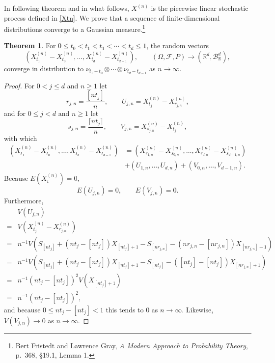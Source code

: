 \documentclass{article}
\theoremstyle{definition}
\newtheorem{theorem}{Theorem}
\theoremstyle{definition}
\begin{document}
In following theorem and in what follows, $X^{(n)}$ is the
piecewise linear stochastic process defined in \eqref{Xtn}. We prove that a sequence of finite-dimensional distributions
converge to a Gaussian measure.\footnote{Bert Fristedt and Lawrence Gray,
{\em A Modern Approach to Probability Theory}, 
p.~368, \S 19.1, Lemma 1.} 

\begin{theorem}
For $0 \leq t_0 < t_1 < t_1 < \cdots < t_d \leq 1$, the random vectors 
\[
(X^{(n)}_{t_1}-X^{(n)}_{t_0},\ldots,X^{(n)}_{t_d}-X^{(n)}_{t_{d-1}}),
\qquad (\Omega,\mathscr{F},P) \to
(\mathbb{R}^d,\mathscr{B}_{\mathbb{R}}^d),
\]
converge in distribution to $\nu_{t_1-t_0} \otimes \cdots \otimes \nu_{t_d-t_{d-1}}$ as $n \to \infty$. 
\label{jointtheorem}
\end{theorem}
\begin{proof}
For $0<j \leq d$ and $n \geq 1$ let
\[
r_{j,n} = \frac{[nt_j]}{n},\qquad U_{j,n} = X^{(n)}_{t_j} - X^{(n)}_{r_{j,n}},
\]
and for $0 \leq j < d$ and $n \geq 1$ let
\[
s_{j,n} = \frac{\lceil nt_j \rceil}{n},\qquad V_{j,n} = X^{(n)}_{s_{j,n}} - X^{(n)}_{t_j},
\]
with which
\begin{align*}
(X^{(n)}_{t_1} - X^{(n)}_{t_{0}},
\ldots,X^{(n)}_{t_d} - X^{(n)}_{t_{d-1}})&=(X^{(n)}_{r_{1,n}}-X^{(n)}_{s_{0,n}},
\ldots,X^{(n)}_{r_{d,n}}-X^{(n)}_{s_{d-1,n}})\\
&+(U_{1,n},\ldots,U_{d,n})+(V_{0,n},\ldots,V_{d-1,n}).
\end{align*}
Because $E(X^{(n)}_t)=0$, 
\[
E(U_{j,n}) = 0,\qquad E(V_{j,n})=0.
\]
Furthermore,
\[
\begin{split}
&V(U_{j,n})\\
=&V(X^{(n)}_{t_j} - X^{(n)}_{r_{j,n}})\\
=&n^{-1} V(S_{[nt_j]} +(nt_j-[nt_j]) X_{[nt_j]+1} - S_{[nr_{j,n}]} - (nr_{j,n}-[nr_{j,n}]) X_{[nr_{j,n}]+1})\\
=&n^{-1} V(S_{[nt_j]} +(nt_j-[nt_j]) X_{[nt_j]+1} - S_{[nt_j]} - ([nt_j]-[nt_j]) X_{[nr_{j,n}]+1})\\
=&n^{-1} (nt_j-[nt_j])^2 V(X_{[nt_j]+1})\\
=&n^{-1} (nt_j-[nt_j])^2,
\end{split}
\]
and because $0 \leq nt_j-[nt_j] < 1$ this tends to $0$ as $n \to \infty$. Likewise,
$V(V_{j,n}) \to 0$ as $n \to \infty$. 



\end{proof}
\end{document}
